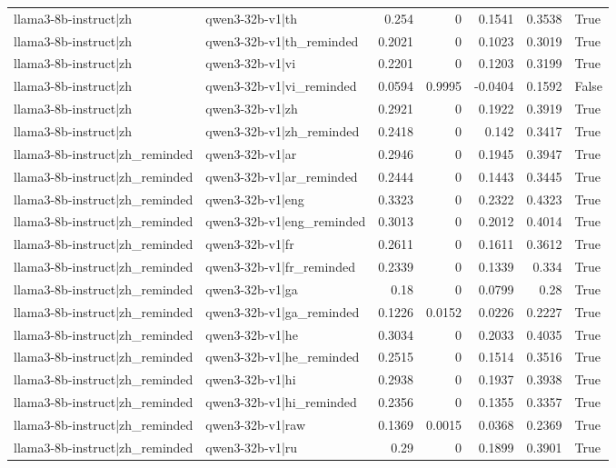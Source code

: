 \begin{table}
\begin{tabular}{l l r r r r l}
llama3-8b-instruct|zh & qwen3-32b-v1|th & 0.254 & 0 & 0.1541 & 0.3538 & True \\
llama3-8b-instruct|zh & qwen3-32b-v1|th_reminded & 0.2021 & 0 & 0.1023 & 0.3019 & True \\
llama3-8b-instruct|zh & qwen3-32b-v1|vi & 0.2201 & 0 & 0.1203 & 0.3199 & True \\
llama3-8b-instruct|zh & qwen3-32b-v1|vi_reminded & 0.0594 & 0.9995 & -0.0404 & 0.1592 & False \\
llama3-8b-instruct|zh & qwen3-32b-v1|zh & 0.2921 & 0 & 0.1922 & 0.3919 & True \\
llama3-8b-instruct|zh & qwen3-32b-v1|zh_reminded & 0.2418 & 0 & 0.142 & 0.3417 & True \\
llama3-8b-instruct|zh_reminded & qwen3-32b-v1|ar & 0.2946 & 0 & 0.1945 & 0.3947 & True \\
llama3-8b-instruct|zh_reminded & qwen3-32b-v1|ar_reminded & 0.2444 & 0 & 0.1443 & 0.3445 & True \\
llama3-8b-instruct|zh_reminded & qwen3-32b-v1|eng & 0.3323 & 0 & 0.2322 & 0.4323 & True \\
llama3-8b-instruct|zh_reminded & qwen3-32b-v1|eng_reminded & 0.3013 & 0 & 0.2012 & 0.4014 & True \\
llama3-8b-instruct|zh_reminded & qwen3-32b-v1|fr & 0.2611 & 0 & 0.1611 & 0.3612 & True \\
llama3-8b-instruct|zh_reminded & qwen3-32b-v1|fr_reminded & 0.2339 & 0 & 0.1339 & 0.334 & True \\
llama3-8b-instruct|zh_reminded & qwen3-32b-v1|ga & 0.18 & 0 & 0.0799 & 0.28 & True \\
llama3-8b-instruct|zh_reminded & qwen3-32b-v1|ga_reminded & 0.1226 & 0.0152 & 0.0226 & 0.2227 & True \\
llama3-8b-instruct|zh_reminded & qwen3-32b-v1|he & 0.3034 & 0 & 0.2033 & 0.4035 & True \\
llama3-8b-instruct|zh_reminded & qwen3-32b-v1|he_reminded & 0.2515 & 0 & 0.1514 & 0.3516 & True \\
llama3-8b-instruct|zh_reminded & qwen3-32b-v1|hi & 0.2938 & 0 & 0.1937 & 0.3938 & True \\
llama3-8b-instruct|zh_reminded & qwen3-32b-v1|hi_reminded & 0.2356 & 0 & 0.1355 & 0.3357 & True \\
llama3-8b-instruct|zh_reminded & qwen3-32b-v1|raw & 0.1369 & 0.0015 & 0.0368 & 0.2369 & True \\
llama3-8b-instruct|zh_reminded & qwen3-32b-v1|ru & 0.29 & 0 & 0.1899 & 0.3901 & True \\

\end{tabular}
\end{table}
